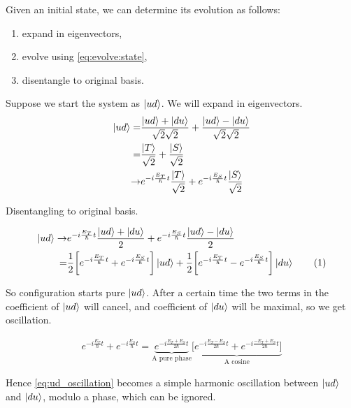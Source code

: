 \documentclass[]{article}
\newcommand\numberthis{\addtocounter{equation}{1}\tag{\theequation}}
\begin{document}
Given an initial state, we can determine its evolution as follows:
\begin{enumerate}
	\item expand in eigenvectors,
	\item evolve using \eqref{eq:evolve:state},
	\item disentangle to original basis.
\end{enumerate} 

Suppose we start the system as $\ket{ud}$. We will expand in eigenvectors.
\begin{align*}
	\ket{ud} =& \frac{\ket{ud}+\ket{du}}{\sqrt{2} \sqrt{2}} + \frac{\ket{ud}-\ket{du}}{\sqrt{2} \sqrt{2}}\\
	=& \frac{\ket{T}}{\sqrt{2}} + \frac{\ket{S}}{\sqrt{2}}\\
	\rightarrow&e^{-i \frac{E_T}{\hbar}t} \frac{\ket{T}}{\sqrt{2}} + e^{-i \frac{E_S}{\hbar}t} \frac{\ket{S}}{\sqrt{2}}
\end{align*}

Disentangling to original basis.

\begin{align*}
	\ket{ud} \rightarrow& e^{-i \frac{E_T}{\hbar}t} \frac{\ket{ud}+\ket{du}}{2} +  e^{-i \frac{E_S}{\hbar}t} \frac{\ket{ud}-\ket{du}}{2}\\
	=& \frac{1}{2}\bigg[ e^{-i \frac{E_T}{\hbar}t} + e^{-i \frac{E_S}{\hbar}t} \bigg]\ket{ud} + \frac{1}{2}\bigg[ e^{-i \frac{E_T}{\hbar}t} - e^{-i \frac{E_S}{\hbar}t}\bigg]\ket{du} \numberthis \label{eq:ud_oscillation}
\end{align*}

So configuration starts pure $\ket{ud}$. After a certain time the two terms in the coefficient of $\ket{ud}$ will cancel, and coefficient of $\ket{du}$ will be maximal, so we get oscillation.

\begin{align*}
	 e^{-i \frac{E_T}{\hbar}t} + e^{-i \frac{E_S}{\hbar}t} = \underbrace{e^{-i \frac{E_T+E_S}{2\hbar}t}}_\text{A pure phase}\underbrace{\bigg[e^{-i \frac{E_T-E_S}{2\hbar}t}+e^{-i \frac{-E_T+E_S}{2\hbar}t}\bigg]}_\text{A cosine}
\end{align*}

Hence \eqref{eq:ud_oscillation} becomes a simple harmonic oscillation between $\ket{ud}$ and $\ket{du}$, modulo a phase, which can be ignored.
\end{document}
